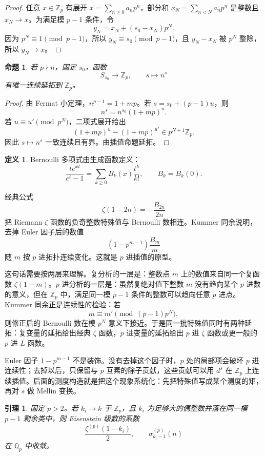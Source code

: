 \documentclass[11pt,a4paper,openany]{ctexbook}
\numberwithin{equation}{chapter}
\newcommand{\Q}{\mathbb{Q}}
\newcommand{\Z}{\mathbb{Z}}
\theoremstyle{plain}
\newtheorem{proposition}[theorem]{命题}
\newtheorem{lemma}[theorem]{引理}
\theoremstyle{definition}
\newtheorem{definition}[theorem]{定义}
\theoremstyle{remark}
\begin{document}
\begin{proof}
任意 $x\in\Z_p$ 有展开 $x=\sum_{n\ge0}a_np^n$，部分和 $x_N=\sum_{n<N}a_np^n$ 是整数且 $x_N\to x$。为满足模 $p-1$ 条件，令
\[
  y_N=x_N+(s_0-x_N)p^N.
\]
因为 $p^N\equiv1\pmod {p-1}$，所以 $y_N\equiv s_0\pmod {p-1}$，且 $y_N-x_N$ 被 $p^N$ 整除，所以 $y_N\to x$。
\end{proof}

\begin{proposition}
若 $p\nmid n$，固定 $s_0$，函数
\[
  S_{s_0}\to\Z_p,\qquad s\mapsto n^s
\]
有唯一连续延拓到 $\Z_p$。
\end{proposition}

\begin{proof}
由 Fermat 小定理，$n^{p-1}=1+mp$。若 $s=s_0+(p-1)u$，则
\[
  n^s=n^{s_0}(1+mp)^u.
\]
若 $u\equiv u'\pmod {p^N}$，二项式展开给出
\[
  (1+mp)^u-(1+mp)^{u'}\in p^{N+1}\Z_p.
\]
因此 $s\mapsto n^s$ 一致连续且有界。由插值命题延拓。
\end{proof}

\begin{definition}
Bernoulli 多项式由生成函数定义：
\[
  \frac{te^{xt}}{e^t-1}=\sum_{k\ge0}B_k(x)\frac{t^k}{k!},\qquad B_k=B_k(0).
\]
\end{definition}

经典公式
\[
  \zeta(1-2n)=-\frac{B_{2n}}{2n}
\]
把 Riemann $\zeta$ 函数的负奇整数特殊值与 Bernoulli 数相连。Kummer 同余说明，去掉 Euler 因子后的数值
\[
  (1-p^{m-1})\frac{B_m}{m}
\]
随 $m$ 按 $p$ 进拓扑连续变化。这就是 $p$ 进插值的原型。

这句话需要按两层来理解。复分析的一层是：整数点 $m$ 上的数值来自同一个复函数 $\zeta(1-m)$。$p$ 进分析的一层是：虽然复绝对值下整数 $m$ 没有趋向某个 $p$ 进数的意义，但在 $\Z_p$ 中，满足同一模 $p-1$ 条件的整数可以趋向任意 $p$ 进点。Kummer 同余正是连续性的检验：若
\[
m\equiv m'\pmod{(p-1)p^N},
\]
则修正后的 Bernoulli 数在模 $p^N$ 意义下接近。于是同一批特殊值同时有两种延拓：复变量的延拓给出经典 $\zeta$ 函数，$p$ 进变量的延拓给出 $p$ 进 $\zeta$ 函数或更一般的 $p$ 进 $L$ 函数。

Euler 因子 $1-p^{m-1}$ 不是装饰。没有去掉这个因子时，$p$ 处的局部项会破坏 $p$ 进连续性；去掉以后，只保留与 $p$ 互素的除子贡献，这些贡献可以用 $d^s$ 在 $\Z_p$ 上连续插值。后面的测度构造就是把这个现象系统化：先把特殊值写成某个测度的矩，再对 $s$ 做 Mellin 变换。

\begin{lemma}
固定 $p>2$。若 $k_i\to k$ 于 $\Z_p$，且 $k_i$ 为足够大的偶整数并落在同一模 $p-1$ 剩余类中，则 Eisenstein 级数的系数
\[
  \frac{\zeta^{(p)}(1-k_i)}2,\qquad \sigma_{k_i-1}^{(p)}(n)
\]
在 $\Q_p$ 中收敛。
\end{lemma}
\end{document}
